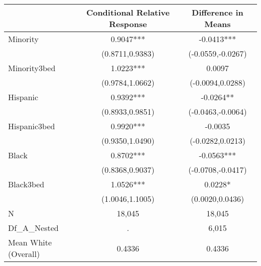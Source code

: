 \begin{tabular}{lcc}
\hline  & Conditional Relative Response & Difference in Means\\
\hline Minority & 0.9047*** & -0.0413***\\
 & (0.8711,0.9383) & (-0.0559,-0.0267)\\
Minority3bed & 1.0223*** & 0.0097\\
 & (0.9784,1.0662) & (-0.0094,0.0288)\\
Hispanic & 0.9392*** & -0.0264**\\
 & (0.8933,0.9851) & (-0.0463,-0.0064)\\
Hispanic3bed & 0.9920*** & -0.0035\\
 & (0.9350,1.0490) & (-0.0282,0.0213)\\
Black & 0.8702*** & -0.0563***\\
 & (0.8368,0.9037) & (-0.0708,-0.0417)\\
Black3bed & 1.0526*** & 0.0228*\\
 & (1.0046,1.1005) & (0.0020,0.0436)\\
N & 18,045 & 18,045\\
Df\_A\_Nested & . & 6,015\\
Mean White (Overall) & 0.4336 & 0.4336\\
\hline\end{tabular}\\
\hfil\\
